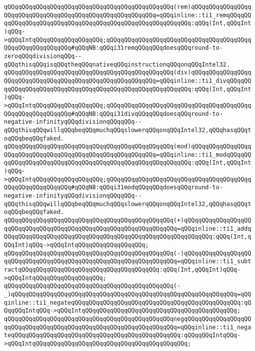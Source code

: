 \verb|qQQqqQQqqQQqqQQqqQQqqQQqqQQqqQQqqQQqqQQqqQQqqQQq(rem)qQQqqQQqqQQqqQQqqQQqqQQqqQQqqQQqqQQqqQQqqQQqqQQqqQQqqQQqqQQq=qQQqinline::ti1_remqQQqqQQqqQQqqQQqqQQqqQQqqQQqqQQqqQQqqQQqqQQqqQQqqQQqqQQqqQQq:qQQq(Int,qQQqInt)qQQq->qQQqIntqQQqqQQqqQQqqQQqqQQq;qQQqqQQqqQQqqQQqqQQqqQQqqQQqqQQqqQQqqQQqqQQqqQQqqQQqqQQqqQQq#qQQqNB:qQQqi31remqQQqqQQqdoesqQQqround-to-zeroqQQqdivisionqQQq--qQQqthisqQQqisqQQqtheqQQqnativeqQQqinstructionqQQqonqQQqIntel32.|\newline
\verb|qQQqqQQqqQQqqQQqqQQqqQQqqQQqqQQqqQQqqQQqqQQqqQQq(div)qQQqqQQqqQQqqQQqqQQqqQQqqQQqqQQqqQQqqQQqqQQqqQQqqQQqqQQqqQQq=qQQqinline::ti1_divqQQqqQQqqQQqqQQqqQQqqQQqqQQqqQQqqQQqqQQqqQQqqQQqqQQqqQQqqQQq:qQQq(Int,qQQqInt)qQQq->qQQqIntqQQqqQQqqQQqqQQqqQQq;qQQqqQQqqQQqqQQqqQQqqQQqqQQqqQQqqQQqqQQqqQQqqQQqqQQqqQQqqQQq#qQQqNB:qQQqi31divqQQqqQQqdoesqQQqround-to-negative-infinityqQQqdivisionqQQqqQQq--qQQqthisqQQqwillqQQqbeqQQqmuchqQQqslowerqQQqonqQQqIntel32,qQQqhasqQQqtoqQQqbeqQQqfaked.|\newline
\verb|qQQqqQQqqQQqqQQqqQQqqQQqqQQqqQQqqQQqqQQqqQQqqQQq(mod)qQQqqQQqqQQqqQQqqQQqqQQqqQQqqQQqqQQqqQQqqQQqqQQqqQQqqQQqqQQq=qQQqinline::ti1_modqQQqqQQqqQQqqQQqqQQqqQQqqQQqqQQqqQQqqQQqqQQqqQQqqQQqqQQqqQQq:qQQq(Int,qQQqInt)qQQq->qQQqIntqQQqqQQqqQQqqQQqqQQq;qQQqqQQqqQQqqQQqqQQqqQQqqQQqqQQqqQQqqQQqqQQqqQQqqQQqqQQqqQQq#qQQqNB:qQQqi31modqQQqqQQqdoesqQQqround-to-negative-infinityqQQqdivisionqQQqqQQq--qQQqthisqQQqwillqQQqbeqQQqmuchqQQqslowerqQQqonqQQqIntel32,qQQqhasqQQqtoqQQqbeqQQqfaked.|\newline
\verb|qQQqqQQqqQQqqQQqqQQqqQQqqQQqqQQqqQQqqQQqqQQqqQQq(+)qQQqqQQqqQQqqQQqqQQqqQQqqQQqqQQqqQQqqQQqqQQqqQQqqQQqqQQqqQQqqQQqqQQq=qQQqinline::ti1_addqQQqqQQqqQQqqQQqqQQqqQQqqQQqqQQqqQQqqQQqqQQqqQQqqQQqqQQqqQQq:qQQq(Int,qQQqInt)qQQq->qQQqIntqQQqqQQqqQQqqQQqqQQq;|\newline
\verb|qQQqqQQqqQQqqQQqqQQqqQQqqQQqqQQqqQQqqQQqqQQqqQQq(-)qQQqqQQqqQQqqQQqqQQqqQQqqQQqqQQqqQQqqQQqqQQqqQQqqQQqqQQqqQQqqQQqqQQq=qQQqinline::ti1_subtractqQQqqQQqqQQqqQQqqQQqqQQqqQQqqQQqqQQqqQQq:qQQq(Int,qQQqInt)qQQq->qQQqIntqQQqqQQqqQQqqQQqqQQq;|\newline
\verb|qQQqqQQqqQQqqQQqqQQqqQQqqQQqqQQqqQQqqQQqqQQqqQQq(-_)qQQqqQQqqQQqqQQqqQQqqQQqqQQqqQQqqQQqqQQqqQQqqQQqqQQqqQQqqQQqqQQq=qQQqinline::ti1_negateqQQqqQQqqQQqqQQqqQQqqQQqqQQqqQQqqQQqqQQqqQQqqQQq:qQQqqQQqIntqQQq->qQQqIntqQQqqQQqqQQqqQQqqQQqqQQqqQQqqQQqqQQqqQQqqQQq;|\newline
\verb|qQQqqQQqqQQqqQQqqQQqqQQqqQQqqQQqqQQqqQQqqQQqqQQqnegqQQqqQQqqQQqqQQqqQQqqQQqqQQqqQQqqQQqqQQqqQQqqQQqqQQqqQQqqQQqqQQqqQQq=qQQqinline::ti1_negateqQQqqQQqqQQqqQQqqQQqqQQqqQQqqQQqqQQqqQQqqQQqqQQq:qQQqqQQqIntqQQq->qQQqIntqQQqqQQqqQQqqQQqqQQqqQQqqQQqqQQqqQQqqQQqqQQq;|\newline
